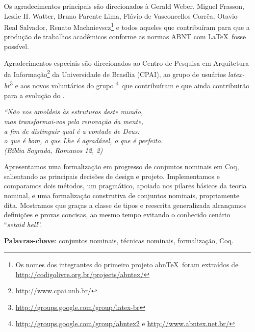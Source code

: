 \documentclass[
    draft,
	12pt,				%
	oneside,
	a4paper,			%
	english,			%
	brazil				%
	]{abntex2}
\begin{document}
\begin{agradecimentos}
Os agradecimentos principais são direcionados à Gerald Weber, Miguel Frasson,
Leslie H. Watter, Bruno Parente Lima, Flávio de Vasconcellos Corrêa, Otavio Real
Salvador, Renato Machnievscz\footnote{Os nomes dos integrantes do primeiro
projeto abn\TeX\ foram extraídos de
\url{http://codigolivre.org.br/projects/abntex/}} e todos aqueles que
contribuíram para que a produção de trabalhos acadêmicos conforme
as normas ABNT com \LaTeX\ fosse possível.

Agradecimentos especiais são direcionados ao Centro de Pesquisa em Arquitetura
da Informação\footnote{\url{http://www.cpai.unb.br/}} da Universidade de
Brasília (CPAI), ao grupo de usuários
\emph{latex-br}\footnote{\url{http://groups.google.com/group/latex-br}} e aos
novos voluntários do grupo
\emph{\abnTeX}\footnote{\url{http://groups.google.com/group/abntex2} e
\url{http://www.abntex.net.br/}}~que contribuíram e que ainda
contribuirão para a evolução do \abnTeX.

\end{agradecimentos}

\begin{epigrafe}
   \vspace*{\fill}
	\begin{flushright}
		\textit{``Não vos amoldeis às estruturas deste mundo, \\
		mas transformai-vos pela renovação da mente, \\
		a fim de distinguir qual é a vontade de Deus: \\
		o que é bom, o que Lhe é agradável, o que é perfeito.\\
		(Bíblia Sagrada, Romanos 12, 2)}
	\end{flushright}
\end{epigrafe}


\setlength{\absparsep}{18pt} %
\begin{resumo}
	Apresentamos uma formalização em progresso de conjuntos nominais em Coq, salientando as principais decisões de design e projeto. Implementamos e comparamos dois métodos, um pragmático, apoiada nos pilares básicos da teoria nominal, e uma formalização construtiva de conjuntos nominais, propriamente dita. Mostramos que graças a classe de tipos e reescrita generalizada alcançamos definições e provas concisas, ao mesmo tempo evitando o conhecido cenário ``\textit{setoid hell}''.

 \textbf{Palavras-chave}: conjuntos nominais, técnicas nominais, formalização, Coq.
\end{resumo}
\end{document}
